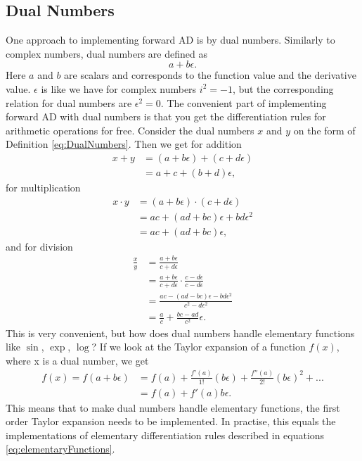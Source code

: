 \subsection{Dual Numbers}
\label{sec:DualNumbers}
One approach to implementing forward AD is by dual numbers. Similarly to complex numbers, dual numbers are defined as 
\begin{equation}
    a + b\epsilon.
    \label{eq:DualNumbers}
\end{equation}
Here $a$ and $b$ are scalars and corresponds to the function value and the derivative value. $\epsilon$ is like we have for complex numbers $i^2 = -1$, but the corresponding relation for dual numbers are $\epsilon^2 = 0$. The convenient part of implementing forward AD with dual numbers is that you get the differentiation rules for arithmetic operations for free. Consider the dual numbers $x$ and $y$ on the form of Definition \eqref{eq:DualNumbers}. Then we get for addition
\begin{align*}
x+y &= (a+b\epsilon)+(c+d\epsilon)\\
    &= a+c+(b+d)\epsilon,
\end{align*}
for multiplication
\begin{align*}
x\cdot y &= (a+b\epsilon)\cdot(c+d\epsilon)\\
    &= ac + (ad + bc)\epsilon + bd\epsilon^2 \\
    &= ac + (ad + bc)\epsilon,
\end{align*}
and for division
\begin{align*}
\frac{x}{y} &= \frac{a+b\epsilon}{c+d\epsilon}\\
    &=\frac{a+b\epsilon}{c+d\epsilon} \cdot \frac{c-d\epsilon}{c-d\epsilon}\\
    &=\frac{ac-(ad-bc)\epsilon-bd\epsilon^2}{c^2-d\epsilon^2}\\
    &=\frac{a}{c} + \frac{bc-ad}{c^2}\epsilon.
\end{align*}
This is very convenient, but how does dual numbers handle elementary functions like $\sin$, $\exp$, $\log$? If we look at the Taylor expansion of a function $f(x)$, where x is a dual number, we get
\begin{align*}
    f(x) = f(a+b\epsilon) &= f(a) + \frac{f'(a)}{1!}(b\epsilon) + \frac{f''(a)}{2!}(b\epsilon)^2+...\\
        &=f(a) + f'(a)b\epsilon.
\end{align*}
This means that to make dual numbers handle elementary functions, the first order Taylor expansion needs to be implemented. In practise, this equals the implementations of elementary differentiation rules described in equations \eqref{eq:elementaryFunctions}. 

